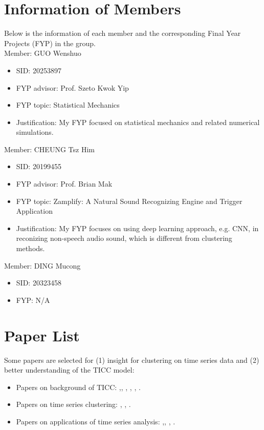 \documentclass{llncs}
\begin{document}
\section{Information of Members}

Below is the information of each member and the corresponding Final Year Projects (FYP) in the group.
\\

  Member: GUO Wenshuo
\begin{itemize}
\item SID: 20253897
\item FYP advisor: Prof. Szeto Kwok Yip
\item FYP topic: Statistical Mechanics 
\item Justification: My FYP focused on statistical mechanics and related numerical simulations.
\end{itemize}

 Member: CHEUNG Tsz Him
\begin{itemize}
\item SID: 20199455
\item FYP advisor: Prof. Brian Mak
\item FYP topic: Zamplify: A Natural Sound Recognizing Engine and Trigger Application
\item Justification: My FYP focuses on using deep learning approach, e.g. CNN, in reconizing non-speech audio sound, which is different from clustering methods.
\end{itemize}

 Member: DING Mucong
\begin{itemize}
\item SID: 20323458
\item FYP: N/A
\end{itemize}

\section{Paper List}
Some papers are selected for (1) insight for clustering on time series data and (2) better understanding of the TICC model\cite{tiic}:

\begin{itemize}
\item Papers on background of TICC:
\cite{DBLP:conf/mue/NiennattrakulR07},\cite{fraley2006mclust}, \cite{xiong2004time}, \cite{smyth1997clustering}, \cite{doi:10.1093/biostatistics/kxm045}, \cite{hallac2016greedy}.

\item  Papers on time series clustering: 
\cite{DBLP:journals/is/AghabozorgiST15}, \cite{DBLP:journals/pr/Liao05}, \cite{segTS}. 
\item Papers on applications of time series analysis: \cite{DEMETRIADES1996387},\cite{DBLP:conf/mue/NiennattrakulR07}, \cite{DBLP:conf/smc/TsujinoO10}, \cite{DBLP:journals/bmcbi/WangJLZWWHZJXW17}.

\end{itemize}
%
%



\end{document}
